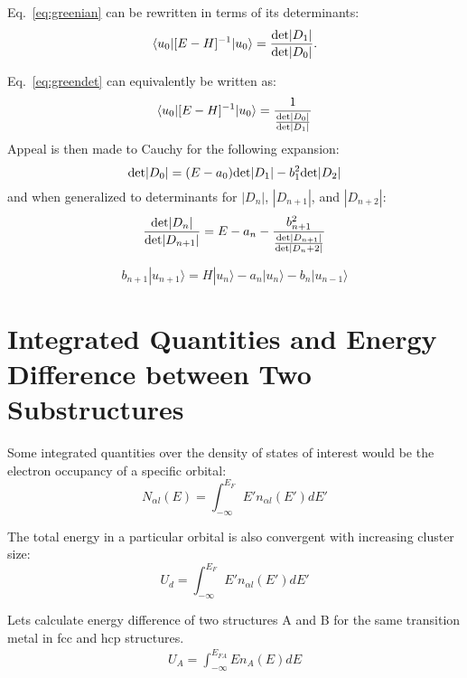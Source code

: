 \documentclass{article}
\def\ket{\rangle}
\def\bra{\langle}
\begin{document}
Eq.~\ref{eq:greenian} can be rewritten in terms of its determinants:
%
\begin{equation}
\label{eq:greendet}
\bra u_{0}|[E-H]^{-1}|u_{0}\ket = \frac{{\rm det}|D_{1}|}{{\rm det}|D_{0}|}.
\end{equation}
%

Eq.~\ref{eq:greendet} can equivalently be written as:
%
\begin{equation}
\label{eq:greendet}
\bra u_{0}|[E-H]^{-1}|u_{0}\ket = \frac{1}{\frac{{\rm det}|D_{0}|}{{\rm det}|D_{1}|}}
\end{equation}
%
Appeal is then made to Cauchy for the following expansion:
%
\begin{equation}
{\rm det}|D_{0}| = (E-a_{0}){\rm det}|D_{1}| - b^{2}_{1}{\rm det}|D_{2}|
\end{equation}
%
and when generalized to determinants for $|D_{n}|$, $|D_{n+1}|$, and $|D_{n+2}|$:
%
\begin{equation}
\frac{{\rm det}|D_{n}|}{{\rm det}|D_{n+1}|} = E -a_{n} - \frac{b^{2}_{n+1}}{\frac{{\rm det}|D_{n+1}|}{{\rm det}|D_n+2|}}
\end{equation}

\begin{equation}
b_{n+1}|u_{n+1}\ket = H |u_{n}\ket - a_{n}|u_{n}\ket - b_{n}|u_{n-1}\ket
\end{equation}

\section{Integrated Quantities and Energy Difference between Two Substructures}
Some integrated quantities over the density of states of interest would be
the electron occupancy of a specific orbital:
%
\begin{equation}
N_{\alpha l}(E) = \int_{-\infty}^{E_{F}}E' n_{\alpha l}(E') dE'
\end{equation}

The total energy in a particular orbital is also convergent with increasing cluster size:
%
\begin{equation}
U_{d} = \int_{-\infty}^{E_{F}}E'n_{\alpha l}(E') dE'
\end{equation}
%

Lets calculate energy difference of two structures A and B for the same transition metal
in fcc and hcp structures.
%
\begin{eqnarray}
\label{eq:Ua}
U_{A} = \int_{-\infty}^{E_{FA}} E n_{A}(E) dE
\end{eqnarray}
\end{document}
